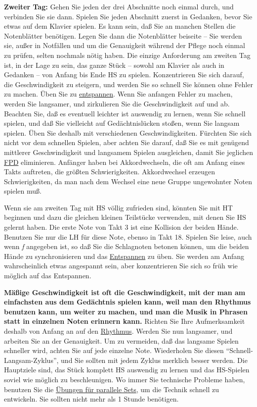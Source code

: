 \textbf{Zweiter Tag:} Gehen Sie jeden der drei Abschnitte noch einmal durch, und verbinden Sie sie dann.
Spielen Sie jeden Abschnitt zuerst in Gedanken, bevor Sie etwas auf dem Klavier spielen.
Es kann sein, daß Sie an manchen Stellen die Notenblätter benötigen.
Legen Sie dann die Notenblätter beiseite -- Sie werden sie, außer in Notfällen und um die Genauigkeit während der Pflege noch einmal zu prüfen, selten nochmals nötig haben.
Die einzige Anforderung am zweiten Tag ist, in der Lage zu sein, das ganze Stück -- sowohl am Klavier als auch in Gedanken -- von Anfang bis Ende HS zu spielen.
Konzentrieren Sie sich darauf, die Geschwindigkeit zu steigern, und werden Sie so schnell Sie können ohne Fehler zu machen.
Üben Sie zu \hyperref[c1ii14]{entspannen}.
Wenn Sie anfangen Fehler zu machen, werden Sie langsamer, und zirkulieren Sie die Geschwindigkeit auf und ab.
Beachten Sie, daß es eventuell leichter ist auswendig zu lernen, wenn Sie schnell spielen, und daß Sie vielleicht auf Gedächtnislücken stoßen, wenn Sie langsam spielen.
Üben Sie deshalb mit verschiedenen Geschwindigkeiten.
Fürchten Sie sich nicht vor dem schnellen Spielen, aber achten Sie darauf, daß Sie es mit genügend mittlerer Geschwindigkeit und langsamem Spielen ausgleichen, damit Sie jeglichen \hyperref[fpd]{FPD} eliminieren.
Anfänger haben bei Akkordwechseln, die oft am Anfang eines Takts auftreten, die größten Schwierigkeiten.
Akkordwechsel erzeugen Schwierigkeiten, da man nach dem Wechsel eine neue Gruppe ungewohnter Noten spielen muß.

Wenn sie am zweiten Tag mit HS völlig zufrieden sind, könnten Sie mit HT beginnen und dazu die gleichen kleinen Teilstücke verwenden, mit denen Sie HS gelernt haben.
Die erste Note von Takt 3 ist eine Kollision der beiden Hände. Benutzen Sie nur die LH für diese Note, ebenso in Takt 18.
Spielen Sie leise, auch wenn \textit{f} angegeben ist, so daß Sie die Schlagnoten betonen können, um die beiden Hände zu synchronisieren und das \hyperref[c1ii14]{Entspannen} zu üben.
Sie werden am Anfang wahrscheinlich etwas angespannt sein, aber konzentrieren Sie sich so früh wie möglich auf das Entspannen.

\textbf{Mäßige Geschwindigkeit ist oft die Geschwindigkeit, mit der man am einfachsten aus dem Gedächtnis spielen kann, weil man den Rhythmus benutzen kann, um weiter zu machen, und man die Musik in Phrasen statt in einzelnen Noten erinnern kann.}
Richten Sie Ihre Aufmerksamkeit deshalb von Anfang an auf den \hyperref[c1iii1b]{Rhythmus}.
Werden Sie nun langsamer, und arbeiten Sie an der Genauigkeit.
Um zu vermeiden, daß das langsame Spielen schneller wird, achten Sie auf jede einzelne Note.
Wiederholen Sie diesen \enquote{Schnell-Langsam-Zyklus}, und Sie sollten mit jedem Zyklus merklich besser werden.
Die Hauptziele sind, das Stück komplett HS auswendig zu lernen und das HS-Spielen soviel wie möglich zu beschleunigen.
Wo immer Sie technische Probleme haben, benutzen Sie die \hyperref[c1iii7b]{Übungen für parallele Sets}, um die Technik schnell zu entwickeln.
Sie sollten nicht mehr als 1 Stunde benötigen.

